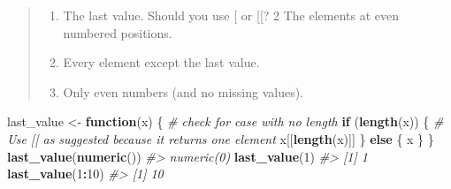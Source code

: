 \documentclass[]{book}
\newenvironment{Shaded}{\begin{snugshade}}{\end{snugshade}}
\newcommand{\CommentTok}[1]{\textcolor[rgb]{0.56,0.35,0.01}{\textit{#1}}}
\newcommand{\ControlFlowTok}[1]{\textcolor[rgb]{0.13,0.29,0.53}{\textbf{#1}}}
\newcommand{\DecValTok}[1]{\textcolor[rgb]{0.00,0.00,0.81}{#1}}
\newcommand{\KeywordTok}[1]{\textcolor[rgb]{0.13,0.29,0.53}{\textbf{#1}}}
\newcommand{\NormalTok}[1]{#1}
\newcommand{\OperatorTok}[1]{\textcolor[rgb]{0.81,0.36,0.00}{\textbf{#1}}}
\newcommand{\StringTok}[1]{\textcolor[rgb]{0.31,0.60,0.02}{#1}}
\providecommand{\tightlist}{%
  \setlength{\itemsep}{0pt}\setlength{\parskip}{0pt}}
\theoremstyle{definition}
\theoremstyle{definition}
\theoremstyle{definition}
\theoremstyle{remark}
\begin{document}
\begin{quote}
\begin{enumerate}
\def\labelenumi{\arabic{enumi}.}
\tightlist
\item
  The last value. Should you use {[} or {[}{[}? 2 The elements at even
  numbered positions.
\item
  Every element except the last value.
\item
  Only even numbers (and no missing values).
\end{enumerate}
\end{quote}

\begin{Shaded}
\begin{Highlighting}[]
\NormalTok{last_value <-}\StringTok{ }\ControlFlowTok{function}\NormalTok{(x) \{}
  \CommentTok{# check for case with no length}
  \ControlFlowTok{if}\NormalTok{ (}\KeywordTok{length}\NormalTok{(x)) \{}
    \CommentTok{# Use [[ as suggested because it returns one element}
\NormalTok{    x[[}\KeywordTok{length}\NormalTok{(x)]]  }
\NormalTok{  \} }\ControlFlowTok{else}\NormalTok{ \{}
\NormalTok{    x}
\NormalTok{  \}}
\NormalTok{\}}
\KeywordTok{last_value}\NormalTok{(}\KeywordTok{numeric}\NormalTok{())}
\CommentTok{#> numeric(0)}
\KeywordTok{last_value}\NormalTok{(}\DecValTok{1}\NormalTok{)}
\CommentTok{#> [1] 1}
\KeywordTok{last_value}\NormalTok{(}\DecValTok{1}\OperatorTok{:}\DecValTok{10}\NormalTok{)}
\CommentTok{#> [1] 10}
\end{Highlighting}
\end{Shaded}

\begin{Shaded}
\end{Shaded}
\end{document}
